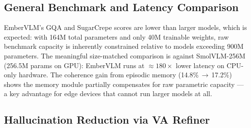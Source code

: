 \documentclass[runningheads]{llncs}
\begin{document}
\subsection{General Benchmark and Latency Comparison}

\begin{table}[ht]
\centering
\caption{Standard multimodal benchmarks. Coherence\,=\,avg(GQA, Winoground, SugarCrepe). EmberVLM latency is CPU-only; baselines run on GPU.}
\label{tab:baselines}
\setlength{\tabcolsep}{4pt}

\end{table}

EmberVLM's GQA and SugarCrepe scores are lower than larger models, which is expected:
with 164M total parameters and only 40M trainable weights, raw benchmark capacity is
inherently constrained relative to models exceeding 900M parameters. The meaningful
size-matched comparison is against SmolVLM-256M (256.5M params on GPU): EmberVLM
runs at ${\approx}180\times$ lower latency on CPU-only hardware. The coherence gain from
episodic memory (14.8\%\,$\rightarrow$\,17.2\%) shows the memory module partially
compensates for raw parametric capacity — a key advantage for edge devices that
cannot run larger models at all.

\subsection{Hallucination Reduction via VA Refiner}
\end{document}
